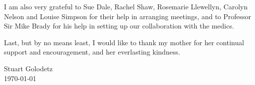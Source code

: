 \begin{acknowledgements}
\begin{itemize}
\end{itemize}
%
I am also very grateful to Sue Dale, Rachel Shaw, Rosemarie Llewellyn, Carolyn Nelson and Louise Simpson for their help in arranging meetings, and to Professor Sir Mike Brady for his help in setting up our collaboration with the medics.

Last, but by no means least, I would like to thank my mother for her continual support and encouragement, and her everlasting kindness.

\begin{center}
Stuart Golodetz \\
\today
\end{center}

\end{acknowledgements}
